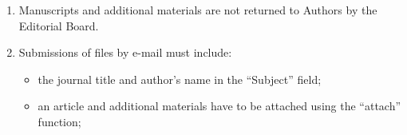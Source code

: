 {{\begin{enumerate}[1.]
Measurement of flow rate and volume of liquids and gases by means of orifice devices]. M.:


Standardinform


Publs. 10~p.












.


2006. Sposob orientirovaniya po krenu letatel'nogo


apparata s opti\-che\-skoy golovkoy


samonavedeniya [The way to orient on the roll of aircraft with optical homing head].


Patent RF No.\,2280590.





References in Latin transcription are presented in the original language.





References in the text are numbered according to the order of their


first appearance; the number is


placed in square brackets. All items from the reference list should be


cited.\\[-13.5pt]





\item Manuscripts and additional materials are not returned to Authors by the Editorial Board.\\[-13.5pt]





\item Submissions of files by e-mail must include:\\[-14pt]


\begin{itemize}


\item   the journal title and author's name in the ``Subject'' field; \\[-13.5pt]


\item   an article and additional materials have to be attached using the ``attach'' function;\\[-13.5pt]



\end{itemize}
\end{enumerate}}}
